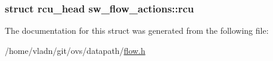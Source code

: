 \subsubsection[{rcu}]{\setlength{\rightskip}{0pt plus 5cm}struct rcu\+\_\+head sw\+\_\+flow\+\_\+actions\+::rcu}\label{structsw__flow__actions_aaf3da3f7607ed9dd956fd8c6e1290831}


The documentation for this struct was generated from the following file\+:\begin{DoxyCompactItemize}
\item 
/home/vladn/git/ovs/datapath/\hyperlink{flow_8h}{flow.\+h}\end{DoxyCompactItemize}

